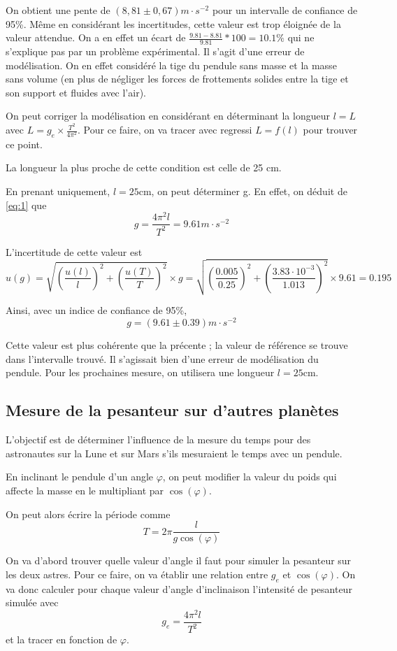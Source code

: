 \documentclass[a4paper,10pt,french]{scrartcl}
\begin{document}
On obtient une pente de \((8,81 \pm 0,67) m \cdot s^{-2}\) pour un intervalle de confiance de 95\%. M\^eme en considérant les incertitudes, cette valeur est trop éloignée de la valeur attendue. On a en effet un écart de \(\frac{9.81-8.81}{9.81} *100 = 10.1\% \) qui ne s'explique pas par un problème expérimental. Il s'agit d'une erreur de modélisation. On en effet considéré la tige du pendule sans masse et la masse sans volume (en plus de négliger les forces de frottements solides entre la tige et son support et fluides avec l'air).

On peut corriger la modélisation en considérant en déterminant la longueur \(l = L\) avec \(L = g_e\times \frac{T^2}{4\pi^2}\). Pour ce faire, on va tracer avec regressi \(L = f(l)\) pour trouver ce point.

La longueur la plus proche de cette condition est celle de 25 cm.

En prenant uniquement, \(l = 25\)cm, on peut déterminer g. En effet, on déduit de \ref{eq:1} que \[g = \frac{4\pi^2l}{T^2} = 9.61 m\cdot s^{-2}\]

L'incertitude de cette valeur est \[u(g) = \sqrt{(\frac{u(l)}{l})^2+(\frac{u(T)}{T})^2} \times g = \sqrt{(\frac{0.005}{0.25})^2+(\frac{3.83\cdot10^{-3}}{1.013})^2}\times 9.61 = 0.195 \]

Ainsi, avec un indice de confiance de 95\%, \[g = (9.61\pm 0.39 )m\cdot s^{-2}\]

Cette valeur est plus cohérente que la précente ; la valeur de référence se trouve dans l'intervalle trouvé. Il s'agissait bien d'une erreur de modélisation du pendule. Pour les prochaines mesure, on utilisera une longueur \(l = 25\)cm.
\subsection{Mesure de la pesanteur sur d'autres planètes}
L'objectif est de déterminer l'influence de la mesure du temps pour des astronautes sur la Lune et sur Mars s'ils mesuraient le temps avec un pendule.

En inclinant le pendule d'un angle \(\varphi\), on peut modifier la valeur du poids qui affecte la masse en le multipliant par \(\cos(\varphi)\).

On peut alors écrire la période comme
\begin{equation}
T = 2\pi \frac{l}{g\cos(\varphi)}
\end{equation}

On va d'abord trouver quelle valeur d'angle il faut pour simuler la pesanteur sur les deux astres. Pour ce faire, on va établir une relation entre \(g_e\) et \(\cos(\varphi)\). On va donc calculer pour chaque valeur d'angle d'inclinaison l'intensité de pesanteur simulée avec \[g_e = \frac{4\pi^2 l}{T^2}\] et la tracer en fonction de \(\varphi\).
\end{document}
